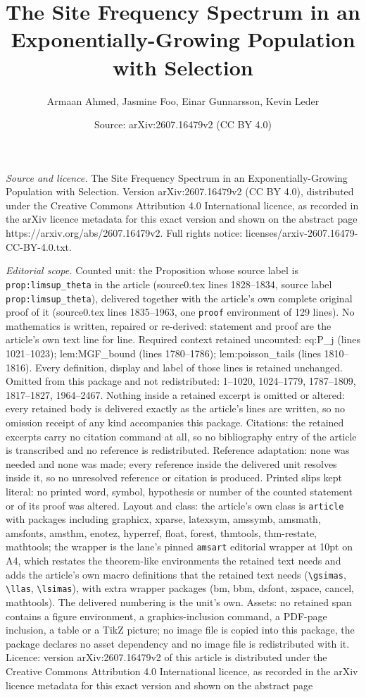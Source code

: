 \documentclass[10pt,a4paper]{amsart}
\title[The Site Frequency Spectrum in an Exponentially-Growing Popu]{The Site Frequency Spectrum in an Exponentially-Growing Population with Selection}
\author{Armaan Ahmed, Jasmine Foo, Einar Gunnarsson, Kevin Leder}
\date{Source: arXiv:2607.16479v2 (CC BY 4.0)}
\begin{document}
\maketitle

\noindent\emph{Source and licence.} The Site Frequency Spectrum in an Exponentially-Growing Population with Selection. Version arXiv:2607.16479v2 (CC BY 4.0), distributed under the Creative Commons Attribution 4.0 International licence, as recorded in the arXiv licence metadata for this exact version and shown on the abstract page https://arxiv.org/abs/2607.16479v2. Full rights notice: licenses/arxiv-2607.16479-CC-BY-4.0.txt.\par\smallskip

\noindent\textit{Editorial scope.} Counted unit: the Proposition whose source label is \texttt{prop:limsup\_theta} in the article (source0.tex lines 1828--1834, source label \texttt{prop:limsup\_theta}), delivered together with the article's own complete original proof of it (source0.tex lines 1835--1963, one \texttt{proof} environment of 129 lines). No mathematics is written, repaired or re-derived: statement and proof are the article's own text line for line. Required context retained uncounted: eq:P\_j (lines 1021--1023); lem:MGF\_bound (lines 1780--1786); lem:poisson\_tails (lines 1810--1816). Every definition, display and label of those lines is retained unchanged. Omitted from this package and not redistributed: 1--1020, 1024--1779, 1787--1809, 1817--1827, 1964--2467. Nothing inside a retained excerpt is omitted or altered: every retained body is delivered exactly as the article's lines are written, so no omission receipt of any kind accompanies this package. Citations: the retained excerpts carry no citation command at all, so no bibliography entry of the article is transcribed and no reference is redistributed. Reference adaptation: none was needed and none was made; every reference inside the delivered unit resolves inside it, so no unresolved reference or citation is produced. Printed slips kept literal: no printed word, symbol, hypothesis or number of the counted statement or of its proof was altered. Layout and class: the article's own class is \texttt{article} with packages including graphicx, xparse, latexsym, amssymb, amsmath, amsfonts, amsthm, enotez, hyperref, float, forest, thmtools, thm-restate, mathtools; the wrapper is the lane's pinned \texttt{amsart} editorial wrapper at 10pt on A4, which restates the theorem-like environments the retained text needs and adds the article's own macro definitions that the retained text needs (\texttt{\textbackslash gsimas}, \texttt{\textbackslash llas}, \texttt{\textbackslash lsimas}), with extra wrapper packages (bm, bbm, dsfont, xspace, cancel, mathtools). The delivered numbering is the unit's own. Assets: no retained span contains a figure environment, a graphics-inclusion command, a PDF-page inclusion, a table or a TikZ picture; no image file is copied into this package, the package declares no asset dependency and no image file is redistributed with it. Licence: version arXiv:2607.16479v2 of this article is distributed under the Creative Commons Attribution 4.0 International licence, as recorded in the arXiv licence metadata for this exact version and shown on the abstract page 
\end{document}
